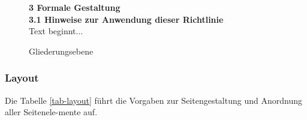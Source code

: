 \begin{figure}[H]
    \begin{framed}
        \begin{doublespace}
            \LARGE
            \textbf{%
            3 \quad Formale Gestaltung\\
            \Large
            3.1 \quad Hinweise zur Anwendung dieser Richtlinie\\
            }
            \normalsize
            Text beginnt...
        \end{doublespace}
    \end{framed}
    \caption{Gliederungsebene}
    \label{fig-gliederungsebene}
\end{figure}
\clearpage %
\subsubsection{Layout}
\label{formal-gestaltung-textteil-layout}
Die Tabelle \ref{tab-layout} führt die Vorgaben zur Seitengestaltung und Anordnung aller Seitenele-mente auf.
